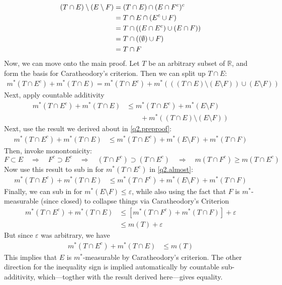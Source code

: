 \documentclass[12pt]{article}
\theoremstyle{plain}
\theoremstyle{definition}
\theoremstyle{remark}
\begin{document}
\begin{enumerate}
\begin{enumerate}
\begin{align}  
    (T\cap E) \setminus (E\setminus F) 
        &= (T\cap E) \cap (E \cap F^c)^c \notag\\
        &= T\cap E \cap (E^c \cup F) \notag\\
        &= T\cap ((E \cap E^c) \cup (E\cap F)) \notag\\
        &= T\cap ((\emptyset)\cup F) \notag\\
        &= T\cap F
        \label{q2.preproof}
\end{align}
Now, we can move onto the main proof. Let $T$ be an arbitrary subset of $\mathbb{R}$, and form the basis for Caratheodory's criterion. Then we can split up $T\cap E$:
\begin{align*}
    m^*(T\cap E^c) +  m^*(T\cap E) = 
    m^*(T\cap E^c) +  m^*(( (T\cap E)\setminus (E\setminus F) )  
    \cup (E\setminus F))
\end{align*}
Next, apply countable additivity 
\begin{align*}
    m^*(T\cap E^c) +  m^*(T\cap E) &\leq 
    m^*(T\cap E^c) + m^*(E\setminus F) \\
    &\qquad   + m^*( (T\cap E)\setminus (E\setminus F) )  
\end{align*}
Next, use the result we derived about in \ref{q2.preproof}:
\begin{align}
    m^*(T\cap E^c) +  m^*(T\cap E) &\leq 
    m^*(T\cap E^c) + m^*(E\setminus F) 
    + m^*(T\cap F)
    \label{q2.almost}
\end{align}
Then, invoke monontonicity:
\[
    F\subset E 
    \quad \Rightarrow \quad
    F^c\supset E^c
    \quad \Rightarrow \quad
    (T\cap F^c)\supset (T\cap E^c)
    \quad \Rightarrow \quad
    m(T \cap F^c) \geq m(T \cap E^c)
\]
Now use this result to sub in for $m^*(T\cap E^c)$ in \ref{q2.almost}:
\begin{align}
    m^*(T\cap E^c) +  m^*(T\cap E) &\leq 
    m^*(T\cap F^c) + m^*(E\setminus F) 
    + m^*(T\cap F)
\end{align}
Finally, we can sub in for $m^*(E\setminus F)\leq \varepsilon$, while also using the fact that $F$ is $m^*$-measurable (since closed) to collapse things via Caratheodory's Criterion
\begin{align*}
    m^*(T\cap E^c) +  m^*(T\cap E) &\leq 
    [m^*(T\cap F^c) + 
     m^*(T\cap F)] 
    +\varepsilon \\
    &\leq 
    m(T)
    +\varepsilon 
\end{align*}
But since $\varepsilon$ was arbitrary, we have 
\begin{align*}
    m^*(T\cap E^c) +  m^*(T\cap E) &\leq 
    m(T)
\end{align*}
This implies that $E$ is $m^*$-measurable by Caratheodory's criterion. The other direction for the inequality sign is implied automatically by countable sub-additivity, which---togther with the result derived here---gives equality.


\end{enumerate}
\end{enumerate}
\end{document}
